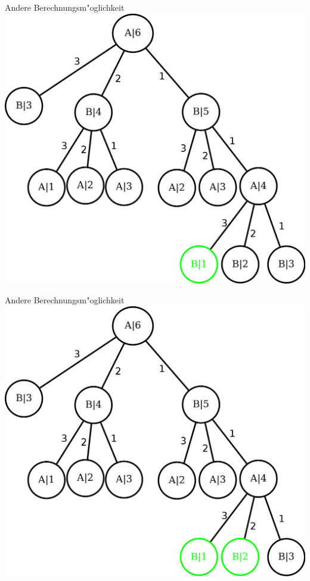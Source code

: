 \documentclass[18pt]{beamer}
\begin{document}
\begin{frame}{Andere Berechnungsm"oglichkeit}
\includegraphics[scale=0.4]{baum1.png}
\end{frame}

\begin{frame}{Andere Berechnungsm"oglichkeit}
\includegraphics[scale=0.4]{baum2.png}
\end{frame}
\end{document}
